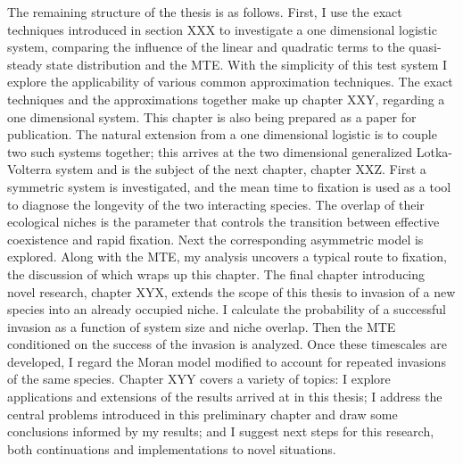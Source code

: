 \documentclass[a4paper,11pt]{article}
\numberwithin{equation}{section} %
\begin{document}
The remaining structure of the thesis is as follows. 
First, I use the exact techniques introduced in section XXX to investigate a one dimensional logistic system, comparing the influence of the linear and quadratic terms to the quasi-steady state distribution and the MTE. 
With the simplicity of this test system I explore the applicability of various common approximation techniques. 
The exact techniques and the approximations together make up chapter XXY, regarding a one dimensional system. 
This chapter is also being prepared as a paper for publication. 
The natural extension from a one dimensional logistic is to couple two such systems together; this arrives at the two dimensional generalized Lotka-Volterra system and is the subject of the next chapter, chapter XXZ. 
First a symmetric system is investigated, and the mean time to fixation is used as a tool to diagnose the longevity of the two interacting species. 
The overlap of their ecological niches is the parameter that controls the transition between effective coexistence and rapid fixation. 
Next the corresponding asymmetric model is explored. 
Along with the MTE, my analysis uncovers a typical route to fixation, the discussion of which wraps up this chapter. 
The final chapter introducing novel research, chapter XYX, extends the scope of this thesis to invasion of a new species into an already occupied niche. 
I calculate the probability of a successful invasion as a function of system size and niche overlap. 
Then the MTE conditioned on the success of the invasion is analyzed. 
Once these timescales are developed, I regard the Moran model modified to account for repeated invasions of the same species. 
Chapter XYY covers a variety of topics: I explore applications and extensions of the results arrived at in this thesis; I address the central problems introduced in this preliminary chapter and draw some conclusions informed by my results; and I suggest next steps for this research, both continuations and implementations to novel situations. 





\iffalse
\section{proposed thesis structure}
Lit review
1D log
2D log, symmetric
2D log, asymmetric
Moran with immigration (influx of an immigrant from a static reservoir)
Closing remarks

Lit Review:
Demographic stochastics
Extinction rates from demographic and environmental stochasticity
Approximation techniques
How things can be calculated exactly
Concept of a niche, the debates therein
Concept of competitive exclusion, debates therein
Biodiversity
Moran and other simple stochastic models
Lotka-Volterra
Deterministically supporting multiple species
\fi




\iffalse


\end{document}
